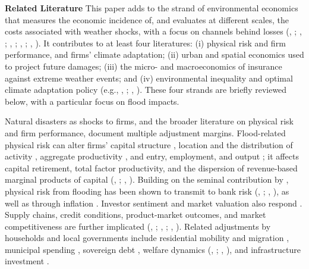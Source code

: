\noindent\textbf{Related Literature} This paper adds to the strand of environmental economics that measures the economic incidence of, and evaluates at different scales, the costs associated with weather shocks, with a focus on channels behind losses (\citeauthor{kahn2005death}, \citeyear{kahn2005death}; 
\citeauthor{dell2012temperature}, \citeyear{dell2012temperature}; 
\citeauthor{deryugina2018economic}, \citeyear{deryugina2018economic}; 
\citeauthor{hansel2020climate}, \citeyear{hansel2020climate}; 
\citeauthor{bilal2023anticipating}, \citeyear{bilal2023anticipating}). It contributes to at least four literatures: (i) physical risk and firm performance, and firms’ climate adaptation; (ii) urban and spatial economics used to project future damages; (iii) the micro- and macroeconomics of insurance against extreme weather events; and (iv) environmental inequality and optimal climate adaptation policy (e.g., \citeauthor{boyce2007inequality}, \citeyear{boyce2007inequality}; \citeauthor{chancel2023climate}, \citeyear{chancel2023climate}). These four strands are briefly reviewed below, with a particular focus on flood impacts.

Natural disasters as shocks to firms, and the broader literature on physical risk and firm performance, document multiple adjustment margins. Flood-related physical risk can alter firms’ capital structure \citep{ginglinger2023climate}, location and the distribution of activity \citep{castro2022climate}, aggregate productivity \citep{kocornik2020flooded}, and entry, employment, and output \citep{jia2022expecting}; it affects capital retirement, total factor productivity, and the dispersion of revenue-based marginal products of capital (\citeauthor{erda2024disasters}, \citeyear{erda2024disasters}; \citeauthor{prieto2024floods}, \citeyear{prieto2024floods}). Building on the seminal contribution by \cite{leiter2009creative}, physical risk from flooding has been shown to transmit to bank risk (\citeauthor{poschl2022banks}, \citeyear{poschl2022banks}; \citeauthor{gallagher2024natural}, \citeyear{gallagher2024natural}),  as well as through inflation \citep{ficarra2025weathering}. Investor sentiment and market valuation also respond \citep{hong2019climate}. Supply chains, credit conditions, product-market outcomes, and market competitiveness are further implicated (\citeauthor{barrot2016input}, \citeyear{barrot2016input}; \citeauthor{balboni2023firm}, \citeyear{balboni2023firm}; \citeauthor{zappala2023sectoral}, \citeyear{zappala2023sectoral}). Related adjustments by households and local governments include residential mobility \citep{lethimillock} and migration \citep{fan2024gone}, municipal spending \citep{morvan2022municipalities}, sovereign debt \citep{dey2022surging}, welfare dynamics (\citeauthor{bilal2023anticipating}, \citeyear{bilal2023anticipating}; \citeauthor{ciscar2011physical}, \citeyear{ciscar2011physical}), and infrastructure investment \citep{balboni2025harm}.

